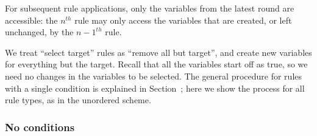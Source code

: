 For subsequent rule applications, only the variables from the latest round are accessible: the $n^{th}$ rule may only access the variables that are created, or left unchanged, by the $n-1^{th}$ rule. 

We treat ``{\sc select} target'' rules as ``{\sc remove} all but target'', and create new variables for everything but the target. Recall that all the variables start off as true, so we need no changes in the variables to be selected. The general procedure for rules with a single condition is explained in Section~; here we show the process for all rule types, as in the unordered scheme.



\subsubsection{No conditions} 


